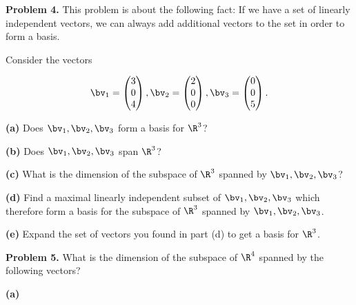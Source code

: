 \documentclass[oneside,12pt]{amsart}
\begin{document}
\textbf{Problem 4.} This problem is about the following fact: If we have a
set of linearly independent vectors, we can always add additional vectors
to the set in order to form a basis.

Consider the vectors

$$
\bv_1 =
\begin{pmatrix}
3 \\ 0 \\ 4
\end{pmatrix},
\bv_2 =
\begin{pmatrix}
2 \\ 0 \\ 0
\end{pmatrix},
\bv_3 =
\begin{pmatrix}
0 \\ 0 \\ 5
\end{pmatrix}.
$$

\textbf{(a)} Does $\bv_1,\bv_2,\bv_3$ form a basis for $\R^3$?

\bigskip
\bigskip
\bigskip
\bigskip
\bigskip
\bigskip



\textbf{(b)} Does $\bv_1,\bv_2,\bv_3$ span $\R^3$?

\bigskip
\bigskip
\bigskip
\bigskip
\bigskip
\bigskip


\textbf{(c)} What is the dimension of the subspace of $\R^3$ spanned by $\bv_1,\bv_2,\bv_3$?

\bigskip
\bigskip
\bigskip
\bigskip
\bigskip
\bigskip


\textbf{(d)} Find a maximal linearly independent subset of $\bv_1,\bv_2,\bv_3$ which
therefore form a basis for the subspace of $\R^3$ spanned by $\bv_1,\bv_2,\bv_3$.

\bigskip
\bigskip
\bigskip
\bigskip
\bigskip
\bigskip

\textbf{(e)} Expand the set of vectors you found in part (d) to get a basis for $\R^3$.

\bigskip
\bigskip
\bigskip
\bigskip
\bigskip
\bigskip

\newpage

\textbf{Problem 5.} What is the dimension of the subspace of $\R^4$ spanned by the following vectors?


\textbf{(a)}
\end{document}
